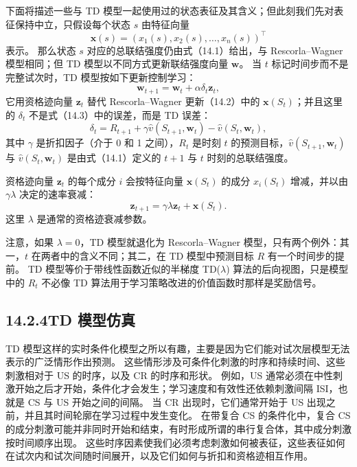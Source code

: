 \documentclass[UTF8, 12pt, fontset=fandol, oneside]{ctexart}
\begin{document}
下面将描述一些与 TD 模型一起使用过的状态表征及其含义；但此刻我们先对表征保持中立，只假设每个状态 $s$ 由特征向量
\[
\mathbf{x}(s)=(x_1(s),x_2(s),\ldots,x_n(s))^\top
\]
表示。
那么状态 $s$ 对应的总联结强度仍由式（14.1）给出，与 Rescorla--Wagner 模型相同；但 TD 模型以不同方式更新联结强度向量 $\mathbf{w}$。
当 $t$ 标记时间步而不是完整试次时，TD 模型按如下更新控制学习：
\begin{equation}
\mathbf{w}_{t+1}=\mathbf{w}_t+\alpha\delta_t\mathbf{z}_t,
\tag{14.4}
\end{equation}
它用资格迹向量 $\mathbf{z}_t$ 替代 Rescorla--Wagner 更新（14.2）中的 $\mathbf{x}(S_t)$；并且这里的 $\delta_t$ 不是式（14.3）中的误差，而是 TD 误差：
\begin{equation}
\delta_t=R_{t+1}+\gamma\hat v(S_{t+1},\mathbf{w}_t)-\hat v(S_t,\mathbf{w}_t),
\tag{14.5}
\end{equation}
其中 $\gamma$ 是折扣因子（介于 0 和 1 之间），$R_t$ 是时刻 $t$ 的预测目标，$\hat v(S_{t+1},\mathbf{w}_t)$ 与 $\hat v(S_t,\mathbf{w}_t)$ 是由式（14.1）定义的 $t+1$ 与 $t$ 时刻的总联结强度。

资格迹向量 $\mathbf{z}_t$ 的每个成分 $i$ 会按特征向量 $\mathbf{x}(S_t)$ 的成分 $x_i(S_t)$ 增减，并以由 $\gamma\lambda$ 决定的速率衰减：
\begin{equation}
\mathbf{z}_{t+1}=\gamma\lambda\mathbf{z}_t+\mathbf{x}(S_t).
\tag{14.6}
\end{equation}
这里 $\lambda$ 是通常的资格迹衰减参数。

注意，如果 $\lambda=0$，TD 模型就退化为 Rescorla--Wagner 模型，只有两个例外：其一，$t$ 在两者中的含义不同；其二，在 TD 模型中预测目标 $R$ 有一个时间步的提前。
TD 模型等价于带线性函数近似的半梯度 TD($\lambda$) 算法的后向视图，只是模型中的 $R_t$ 不必像 TD 算法用于学习策略改进的价值函数时那样是奖励信号。

\subsection*{14.2.4\quad TD 模型仿真}

TD 模型这样的实时条件化模型之所以有趣，主要是因为它们能对试次层模型无法表示的广泛情形作出预测。
这些情形涉及可条件化刺激的时序和持续时间、这些刺激相对于 US 的时序，以及 CR 的时序和形状。
例如，US 通常必须在中性刺激开始之后才开始，条件化才会发生；学习速度和有效性还依赖刺激间隔 ISI，也就是 CS 与 US 开始之间的间隔。
当 CR 出现时，它们通常开始于 US 出现之前，并且其时间轮廓在学习过程中发生变化。
在带复合 CS 的条件化中，复合 CS 的成分刺激可能并非同时开始和结束，有时形成所谓的串行复合体，其中成分刺激按时间顺序出现。
这些时序因素使我们必须考虑刺激如何被表征，这些表征如何在试次内和试次间随时间展开，以及它们如何与折扣和资格迹相互作用。
\end{document}
